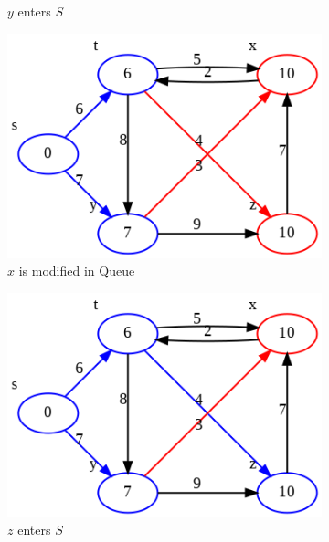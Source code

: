 \documentclass[../main.tex]{subfiles}
\begin{document}
\begin{figure}[!ht]
\begin{subfigure}{.32\textwidth}
    \caption{$y$ enters $S$}
    \end{subfigure}
    \begin{subfigure}{.32\textwidth}
    
    \includegraphics[width=0.99\columnwidth]{fig/dijkstra_3.png}
    \caption{$x$ is modified in Queue}
    \end{subfigure}
        \begin{subfigure}{.32\textwidth}
    \includegraphics[width=0.99\columnwidth]{fig/dijkstra_3.5.png}
    \caption{$z$ enters $S$}
    \end{subfigure}
        \begin{subfigure}{.32\textwidth}

\end{subfigure}
\end{figure}
\end{document}
